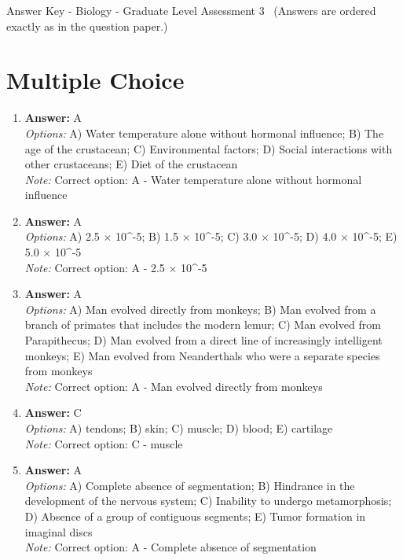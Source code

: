 \documentclass[12pt]{article}
\begin{document}
\begin{center}
Answer Key - Biology - Graduate Level Assessment 3 \
\small (Answers are ordered exactly as in the question paper.)
\end{center}

\section*{Multiple Choice}
\begin{enumerate}[label=\arabic*.]
\item \textbf{Answer:} A
\\ \textit{Options:} A) Water temperature alone without hormonal influence; B) The age of the crustacean; C) Environmental factors; D) Social interactions with other crustaceans; E) Diet of the crustacean
\\ \textit{Note:} Correct option: A - Water temperature alone without hormonal influence
\item \textbf{Answer:} A
\\ \textit{Options:} A) 2.5 \ensuremath{\times} 10^-5; B) 1.5 \ensuremath{\times} 10^-5; C) 3.0 \ensuremath{\times} 10^-5; D) 4.0 \ensuremath{\times} 10^-5; E) 5.0 \ensuremath{\times} 10^-5
\\ \textit{Note:} Correct option: A - 2.5 \ensuremath{\times} 10^-5
\item \textbf{Answer:} A
\\ \textit{Options:} A) Man evolved directly from monkeys; B) Man evolved from a branch of primates that includes the modern lemur; C) Man evolved from Parapithecus; D) Man evolved from a direct line of increasingly intelligent monkeys; E) Man evolved from Neanderthals who were a separate species from monkeys
\\ \textit{Note:} Correct option: A - Man evolved directly from monkeys
\item \textbf{Answer:} C
\\ \textit{Options:} A) tendons; B) skin; C) muscle; D) blood; E) cartilage
\\ \textit{Note:} Correct option: C - muscle
\item \textbf{Answer:} A
\\ \textit{Options:} A) Complete absence of segmentation; B) Hindrance in the development of the nervous system; C) Inability to undergo metamorphosis; D) Absence of a group of contiguous segments; E) Tumor formation in imaginal discs
\\ \textit{Note:} Correct option: A - Complete absence of segmentation
\end{enumerate}
\end{document}
